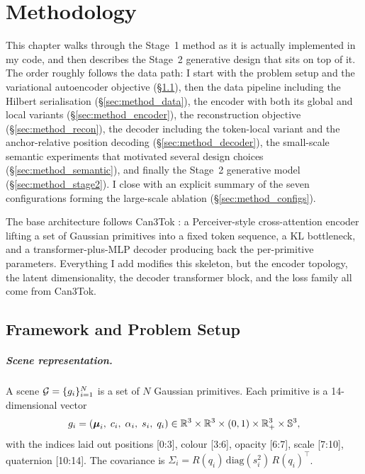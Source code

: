 \chapter{Methodology}
\label{chap:method}

This chapter walks through the Stage~1 method as it is actually implemented in my code, and then describes the Stage~2 generative design that sits on top of it. The order roughly follows the data path: I start with the problem setup and the variational autoencoder objective (\S\ref{sec:method_setup}), then the data pipeline including the Hilbert serialisation (\S\ref{sec:method_data}), the encoder with both its global and local variants (\S\ref{sec:method_encoder}), the reconstruction objective (\S\ref{sec:method_recon}), the decoder including the token-local variant and the anchor-relative position decoding (\S\ref{sec:method_decoder}), the small-scale semantic experiments that motivated several design choices (\S\ref{sec:method_semantic}), and finally the Stage~2 generative model (\S\ref{sec:method_stage2}). I close with an explicit summary of the seven configurations forming the large-scale ablation (\S\ref{sec:method_configs}).

The base architecture follows Can3Tok \citep{gao2025can3tok}: a Perceiver-style cross-attention encoder lifting a set of Gaussian primitives into a fixed token sequence, a KL bottleneck, and a transformer-plus-MLP decoder producing back the per-primitive parameters. Everything I add modifies this skeleton, but the encoder topology, the latent dimensionality, the decoder transformer block, and the loss family all come from Can3Tok.

\section{Framework and Problem Setup}
\label{sec:method_setup}

\paragraph{Scene representation.} A scene $\mathcal{G} = \{g_i\}_{i=1}^{N}$ is a set of $N$ Gaussian primitives. Each primitive is a 14-dimensional vector
\begin{equation}
g_i = (\boldsymbol{\mu}_i,\; c_i,\; \alpha_i,\; s_i,\; q_i) \in \mathbb{R}^3 \times \mathbb{R}^3 \times (0,1) \times \mathbb{R}^3_+ \times \mathbb{S}^3,
\label{eq:prim}
\end{equation}
with the indices laid out positions [0:3], colour [3:6], opacity [6:7], scale [7:10], quaternion [10:14]. The covariance is $\Sigma_i = R(q_i)\,\mathrm{diag}(s_i^2)\,R(q_i)^\top$.

